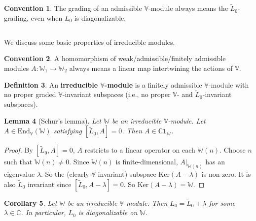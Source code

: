 \documentclass[11pt,b5paper,notitlepage]{article}
\theoremstyle{definition}
\newtheorem{df}{Definition}[section]
\newtheorem{cv}[df]{Convention}
\theoremstyle{plain}
\newtheorem{co}[df]{Corollary}
\newtheorem{lm}[df]{Lemma}
\newcommand{\wtd}{\widetilde}
\newcommand{\End}{\mathrm{End}} %
\newcommand{\id}{\mathbf{1}}
\newcommand{\Vbb}{\mathbb V}
\newcommand{\Wbb}{\mathbb W}
\newcommand{\Cbb}{\mathbb C}
\newcommand{\Ker}{\mathrm{Ker}}
\numberwithin{equation}{section}
\begin{document}
\begin{cv}
	The grading of an admissible $\Vbb$-module always means the $\wtd L_0$-grading, even when $L_0$ is diagonalizable.
\end{cv}











\subsection{}

We discuss some basic properties of irreducible modules. 

\begin{cv}
A homomorphism of weak/admissible/finitely admissible modules $A:\Wbb_1\rightarrow\Wbb_2$ always means a linear map intertwining the actions of $\Vbb$.
\end{cv}


\begin{df}
	An \textbf{irreducible $\Vbb$-module}  is a finitely admissible $\Vbb$-module with no proper graded $\Vbb$-invariant subspaces (i.e., no proper $\Vbb$- and $\wtd L_0$-invariant subspaces). 
\end{df}

\begin{lm}[Schur's lemma]\label{lb82}
Let $\Wbb$ be an irreducible $\Vbb$-module. Let $A\in\End_\Vbb(\Wbb)$ satisfying $[\wtd L_0,A]=0$. Then $A\in\Cbb\id_\Wbb$.
\end{lm}

\begin{proof}
By $[\wtd L_0,A]=0$, $A$ restricts to a linear operator on each $\Wbb(n)$. Choose $n$ such that $\Wbb(n)\neq0$. Since $\Wbb(n)$ is finite-dimensional, $A|_{\Wbb(n)}$ has an eigenvalue $\lambda$. So the (clearly $\Vbb$-invariant) subspace $\Ker(A-\lambda)$ is non-zero. It is also $\wtd L_0$ invariant since $[\wtd L_0,A-\lambda]=0$. So $\Ker(A-\lambda)=\Wbb$.
\end{proof}






\begin{co}\label{lb92}
Let $\Wbb$ be an irreducible $\Vbb$-module. Then $L_0=\wtd L_0+\lambda$ for some $\lambda\in\Cbb$. In particular, $L_0$ is diagonalizable on $\Wbb$.
\end{co}
\end{document}
